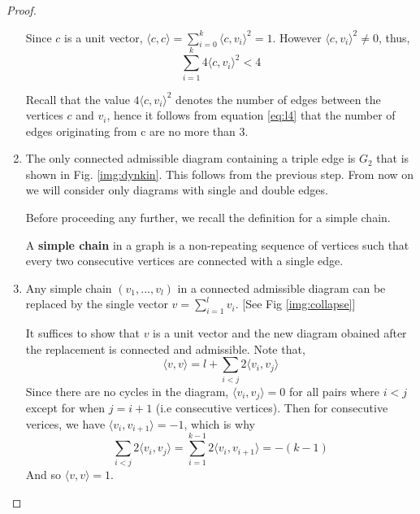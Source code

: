 \begin{proof}
\begin{enumerate}
        Since $c$ is a unit vector, $\langle c, c \rangle = \sum_{i=0}^k \langle c, v_i \rangle^2 = 1$. However 
        $\langle c, v_i \rangle^2 \not= 0$, thus,
            \begin{equation}
                \label{eq:l4}
                \sum_{i=1}^k 4\langle c, v_i \rangle^2 < 4
            \end{equation}
            
        Recall that the value $4\langle c, v_i \rangle^2$ denotes the number of edges between the vertices $c$ and $v_i$, hence
        it follows from equation \ref{eq:l4} that the number of edges originating from c are no more than 3.
            
        \item The only connected admissible diagram containing a triple edge is $G_2$ that is shown in Fig. \ref{img:dynkin}.
        This follows from the previous step. From now on we will consider only diagrams with single and double edges.
        
        Before proceeding any further, we recall the definition for a simple chain.
        \begin{definition}
            A \textbf{simple chain} in a graph is a non-repeating sequence of vertices such that every two consecutive vertices are
            connected with a single edge.
        \end{definition}

        \item Any simple chain $(v_1, ..., v_l)$ in a connected admissible diagram can be replaced by the single vector 
        $v = \sum_{i=1}^l v_i$. [See Fig \ref{img:collapse}]

        It suffices to show that $v$ is a unit vector and the new diagram obained after the replacement is connected and admissible.
        Note that,
            \begin{equation*}
                \langle v, v \rangle = l + \sum_{i < j} 2 \langle v_i, v_j \rangle
            \end{equation*}
        Since there are no cycles in the diagram, $\langle v_i, v_j \rangle = 0$ for all pairs where $i < j$ except for when $j = i+1$
        (i.e consecutive vertices). Then for consecutive verices, we have $\langle v_i, v_{i+1} \rangle = -1$, which is why 
        \begin{equation*}
            \sum_{i < j} 2 \langle v_i, v_j \rangle = \sum_{i  = 1}^{k-1} 2 \langle v_i, v_{i+1} \rangle = -(k-1)
        \end{equation*}
        And so $\langle v, v \rangle = 1$.


\end{enumerate}
\end{proof}
